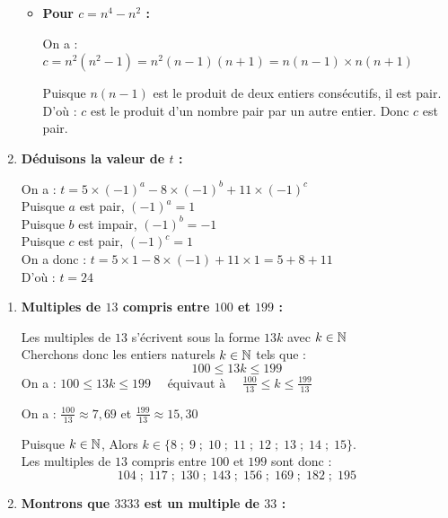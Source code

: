 \documentclass[10pt, a4paper]{article}
\begin{document}
\begin{multicols*}{2}
\begin{Solution}[APPLICATION][3]
\begin{enumerate}[leftmargin=*,itemsep=0.5pt]
\begin{itemize}[leftmargin=*,itemsep=0.5pt]
        \item \textbf{Pour $c = n^4 - n^2$ :}

        On a :~  $c = n^2(n^2 - 1) = n^2(n-1)(n+1) = n(n-1) \times n(n+1)$

        Puisque $n(n-1)$ est le produit de deux entiers consécutifs, il est pair. 
        D'où : $c$ est le produit d'un nombre pair par un autre entier. 
        Donc $c$ est pair.
    \end{itemize}

    \item \textbf{Déduisons la valeur de $t$ :}

    On a : $t = 5 \times (-1)^a - 8 \times (-1)^b + 11 \times (-1)^c$ \\
    Puisque $a$ est pair, $(-1)^a = 1$ \\
    Puisque $b$ est impair, $(-1)^b = -1$ \\
    Puisque $c$ est pair, $(-1)^c = 1$ \\
    On a donc :
    $t = 5 \times 1 - 8 \times (-1) + 11 \times 1
     = 5 + 8 + 11$ \\
    D'où : \quad $t = 24$
\end{enumerate}
\end{Solution}

\begin{Solution}[APPLICATION][4]
\begin{enumerate}[leftmargin=*,itemsep=0.5pt]
    \item \textbf{Multiples de $13$ compris entre $100$ et $199$ :}

    Les multiples de $13$ s'écrivent sous la forme $13k$ avec $k \in \mathbb{N}$ \\
    Cherchons donc les entiers naturels $k \in \mathbb{N}$ tels que : $$100 \leq 13k \leq 199$$
    On a : $100 \leq 13k \leq 199 \quad \text{ équivaut à } \quad \frac{100}{13} \leq k \leq \frac{199}{13}$

    On a : $\frac{100}{13} \approx 7{,}69$ \quad et \quad $\frac{199}{13} \approx 15{,}30$

    Puisque $k \in \mathbb{N}$, 
    Alors $k \in \big\{8 \; ; \; 9 \; ; \; 10 \; ; \; 11 \; ; \; 12 \; ; \; 13 \; ; \; 14 \; ; \; 15\big\}$. \\
    Les multiples de $13$ compris entre $100$ et $199$ sont donc : \\
    \[104 \; ; \; 117 \; ; \; 130 \; ; \; 143 \; ; \; 156 \; ; \; 169 \; ; \; 182 \; ; \; 195\]

    \item \textbf{Montrons que $3333$ est un multiple de $33$ :}


\end{enumerate}
\end{Solution}
\end{multicols*}
\end{document}
